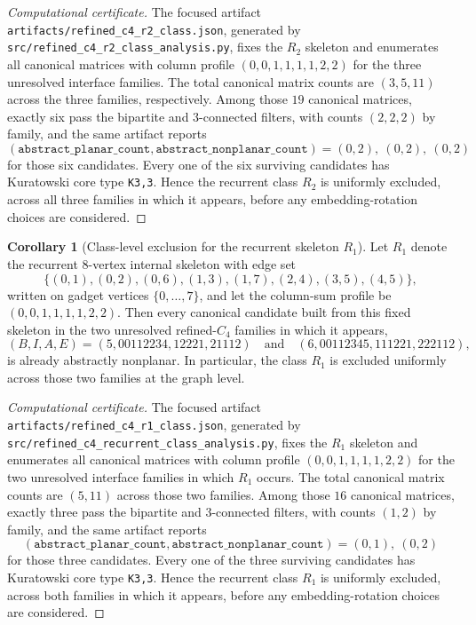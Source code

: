 \documentclass[12pt]{article}
\theoremstyle{definition}
\newtheorem{corollary}[theorem]{Corollary}
\begin{document}
\begin{proof}[Computational certificate]
The focused artifact \texttt{artifacts/refined\_c4\_r2\_class.json}, generated by \texttt{src/refined\_c4\_r2\_class\_analysis.py}, fixes the $R_2$ skeleton and enumerates all canonical matrices with column profile $(0,0,1,1,1,1,2,2)$ for the three unresolved interface families. The total canonical matrix counts are $(3,5,11)$ across the three families, respectively. Among those $19$ canonical matrices, exactly six pass the bipartite and $3$-connected filters, with counts $(2,2,2)$ by family, and the same artifact reports
\[
(\texttt{abstract\_planar\_count},\texttt{abstract\_nonplanar\_count})=(0,2),\ (0,2),\ (0,2)
\]
for those six candidates. Every one of the six surviving candidates has Kuratowski core type \texttt{K3,3}. Hence the recurrent class $R_2$ is uniformly excluded, across all three families in which it appears, before any embedding-rotation choices are considered.
\end{proof}

\begin{corollary}[Class-level exclusion for the recurrent skeleton $R_1$]
\label{cor:r1-class-exclusion}
Let $R_1$ denote the recurrent $8$-vertex internal skeleton with edge set
\[
\{(0,1),(0,2),(0,6),(1,3),(1,7),(2,4),(3,5),(4,5)\},
\]
written on gadget vertices $\{0,\dots,7\}$, and let the column-sum profile be $(0,0,1,1,1,1,2,2)$. Then every canonical candidate built from this fixed skeleton in the two unresolved refined-$C_4$ families in which it appears,
\[
(B,I,A,E)=(5,00112234,12221,21112)\quad\text{and}\quad (6,00112345,111221,222112),
\]
is already abstractly nonplanar. In particular, the class $R_1$ is excluded uniformly across those two families at the graph level.
\end{corollary}

\begin{proof}[Computational certificate]
The focused artifact \texttt{artifacts/refined\_c4\_r1\_class.json}, generated by \texttt{src/refined\_c4\_recurrent\_class\_analysis.py}, fixes the $R_1$ skeleton and enumerates all canonical matrices with column profile $(0,0,1,1,1,1,2,2)$ for the two unresolved interface families in which $R_1$ occurs. The total canonical matrix counts are $(5,11)$ across those two families. Among those $16$ canonical matrices, exactly three pass the bipartite and $3$-connected filters, with counts $(1,2)$ by family, and the same artifact reports
\[
(\texttt{abstract\_planar\_count},\texttt{abstract\_nonplanar\_count})=(0,1),\ (0,2)
\]
for those three candidates. Every one of the three surviving candidates has Kuratowski core type \texttt{K3,3}. Hence the recurrent class $R_1$ is uniformly excluded, across both families in which it appears, before any embedding-rotation choices are considered.
\end{proof}
\end{document}
